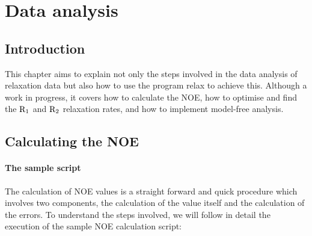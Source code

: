 
\chapter{Data analysis}




\section{Introduction}

This chapter aims to explain not only the steps involved in the data analysis of relaxation data but also how to use the program relax to achieve this.  Although a work in progress, it covers how to calculate the NOE, how to optimise and find the $\mathrm{R}_1$ and $\mathrm{R}_2$ relaxation rates, and how to implement model-free analysis.



\section{Calculating the NOE}


\subsubsection{The sample script}

The calculation of NOE values is a straight forward and quick procedure which involves two components, the calculation of the value itself and the calculation of the errors.  To understand the steps involved, we will follow in detail the execution of the sample NOE calculation script:


